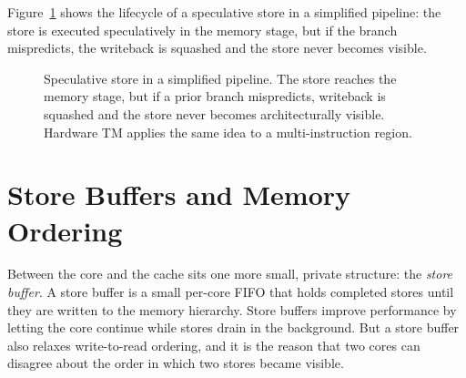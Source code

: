 Figure~\ref{fig:pipeline-squash} shows the lifecycle of a speculative store in
a simplified pipeline: the store is executed speculatively in the memory
stage, but if the branch mispredicts, the writeback is squashed and the store
never becomes visible.

\begin{figure}[htbp]
\centering
{}
\caption{Speculative store in a simplified pipeline. The store reaches the
memory stage, but if a prior branch mispredicts, writeback is squashed and
the store never becomes architecturally visible. Hardware TM applies the
same idea to a multi-instruction region.}
\label{fig:pipeline-squash}
\end{figure}

\section{Store Buffers and Memory Ordering}

Between the core and the cache sits one more small, private structure: the
\emph{store buffer}. A store buffer is a small per-core FIFO that holds
completed stores until they are written to the memory hierarchy. Store
buffers improve performance by letting the core continue while stores drain
in the background. But a store buffer also relaxes write-to-read ordering,
and it is the reason that two cores can disagree about the order in which
two stores became visible.

